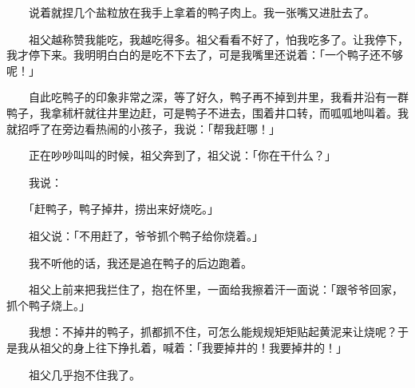 \documentclass[UTF8]{ctexart}
\begin{document}
　　说着就捏几个盐粒放在我手上拿着的鸭子肉上。我一张嘴又进肚去了。

　　祖父越称赞我能吃，我越吃得多。祖父看看不好了，怕我吃多了。让我停下，我才停下来。我明明白白的是吃不下去了，可是我嘴里还说着：「一个鸭子还不够呢！」

　　自此吃鸭子的印象非常之深，等了好久，鸭子再不掉到井里，我看井沿有一群鸭子，我拿秫杆就往井里边赶，可是鸭子不进去，围着井口转，而呱呱地叫着。我就招呼了在旁边看热闹的小孩子，我说：「帮我赶哪！」

　　正在吵吵叫叫的时候，祖父奔到了，祖父说：「你在干什么？」

　　我说：

　　「赶鸭子，鸭子掉井，捞出来好烧吃。」

　　祖父说：「不用赶了，爷爷抓个鸭子给你烧着。」

　　我不听他的话，我还是追在鸭子的后边跑着。

　　祖父上前来把我拦住了，抱在怀里，一面给我擦着汗一面说：「跟爷爷回家，抓个鸭子烧上。」

　　我想：不掉井的鸭子，抓都抓不住，可怎么能规规矩矩贴起黄泥来让烧呢？于是我从祖父的身上往下挣扎着，喊着：「我要掉井的！我要掉井的！」

　　祖父几乎抱不住我了。
\end{document}
